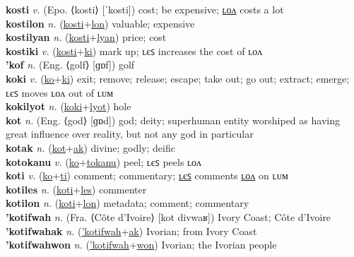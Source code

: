 \textbf{kosti} \textit{v.} (Epo. ⟨kosti⟩ [ˈkosti])
cost; be expensive; \hyperref[kostilon]{ʟᴏᴧ} costs a lot \label{kosti} \\
\textbf{kostilon} \textit{n.} (\hyperref[kosti]{kosti}+\hyperref[lon]{lon})
valuable; expensive \label{kostilon} \\
\textbf{kostilyan} \textit{n.} (\hyperref[kosti]{kosti}+\hyperref[lyan]{lyan})
price; cost \label{kostilyan} \\
\textbf{kostiki} \textit{v.} (\hyperref[kosti]{kosti}+\hyperref[ki]{ki})
mark up; ʟєꜱ increases the cost of ʟᴏᴧ \label{kostiki} \\
\textbf{'kof} \textit{n.} (Eng. ⟨golf⟩ [ɡɒf])
golf \label{'kof} \\
\textbf{koki} \textit{v.} (\hyperref[ko]{ko}+\hyperref[ki]{ki})
exit; remove; release; escape; take out; go out; extract; emerge; ʟєꜱ moves ʟᴏᴧ out of ʟᴜᴍ \label{koki} \\
\textbf{kokilyot} \textit{n.} (\hyperref[koki]{koki}+\hyperref[lyot]{lyot})
hole \label{kokilyot} \\
\textbf{kot} \textit{n.} (Eng. ⟨god⟩ [ɡɒd])
god; deity; superhuman entity worshiped as having great influence over reality, but not any god in particular \label{kot} \\
\textbf{kotak} \textit{n.} (\hyperref[kot]{kot}+\hyperref[ak]{ak})
divine; godly; deific \label{kotak} \\
\textbf{kotokanu} \textit{v.} (\hyperref[ko]{ko}+\hyperref[tokanu]{tokanu})
peel; ʟєꜱ peels ʟᴏᴧ \label{kotokanu} \\
\textbf{koti} \textit{v.} (\hyperref[ko]{ko}+\hyperref[ti]{ti})
comment; commentary; \hyperref[kotiles]{ʟєꜱ} comments \hyperref[kotilon]{ʟᴏᴧ} on ʟᴜᴍ \label{koti} \\
\textbf{kotiles} \textit{n.} (\hyperref[koti]{koti}+\hyperref[les]{les})
commenter \label{kotiles} \\
\textbf{kotilon} \textit{n.} (\hyperref[koti]{koti}+\hyperref[lon]{lon})
metadata; comment; commentary \label{kotilon} \\
\textbf{'kotifwah} \textit{n.} (Fra. ⟨Côte d’Ivoire⟩ [kot divwaʁ])
Ivory Coast; Côte d’Ivoire \label{'kotifwah} \\
\textbf{'kotifwahak} \textit{n.} (\hyperref['kotifwah]{'kotifwah}+\hyperref[ak]{ak})
Ivorian; from Ivory Coast \label{'kotifwahak} \\
\textbf{'kotifwahwon} \textit{n.} (\hyperref['kotifwah]{'kotifwah}+\hyperref[won]{won})
Ivorian; the Ivorian people \label{'kotifwahwon} \\
